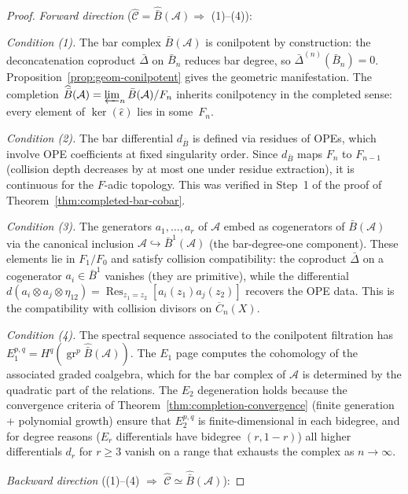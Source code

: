 \begin{proof}
\emph{Forward direction} ($\widehat{\mathcal{C}} = \widehat{\bar{B}}(\mathcal{A}) \Rightarrow$ (1)--(4)):

\emph{Condition (1).} The bar complex $\bar{B}(\mathcal{A})$ is conilpotent by construction: the deconcatenation coproduct $\bar{\Delta}$ on $\bar{B}_n$ reduces bar degree, so $\bar{\Delta}^{(n)}(\bar{B}_n) = 0$.  Proposition~\ref{prop:geom-conilpotent} gives the geometric manifestation.  The completion
$\widehat{\bar{B}}(\mathcal{A}) = \varprojlim_n \bar{B}(\mathcal{A})/F_n$
inherits conilpotency in the completed sense: every element of $\ker(\hat{\epsilon})$ lies in some~$F_n$.

\emph{Condition (2).} The bar differential $d_{\bar{B}}$ is defined via residues of OPEs, which involve OPE coefficients at fixed singularity order.  Since $d_{\bar{B}}$ maps $F_n$ to $F_{n-1}$ (collision depth decreases by at most one under residue extraction), it is continuous for the $F$-adic topology.  This was verified in Step~1 of the proof of Theorem~\ref{thm:completed-bar-cobar}.

\emph{Condition (3).} The generators $a_1, \ldots, a_r$ of $\mathcal{A}$ embed as cogenerators of $\bar{B}(\mathcal{A})$ via the canonical inclusion $\mathcal{A} \hookrightarrow \bar{B}^1(\mathcal{A})$ (the bar-degree-one component).  These elements lie in $F_1/F_0$ and satisfy collision compatibility: the coproduct $\bar{\Delta}$ on a cogenerator $a_i \in \bar{B}^1$ vanishes (they are primitive), while the differential $d(a_i \otimes a_j \otimes \eta_{12}) = \operatorname{Res}_{z_1 = z_2}[a_i(z_1)a_j(z_2)]$ recovers the OPE data.  This is the compatibility with collision divisors on $\overline{C}_n(X)$.

\emph{Condition (4).} The spectral sequence associated
to the conilpotent filtration has
$E_1^{p,q} = H^q(\operatorname{gr}^p
\widehat{\bar{B}}(\mathcal{A}))$.
The $E_1$ page computes the cohomology of the associated graded
coalgebra, which for the bar complex of $\mathcal{A}$ is determined by
the quadratic part of the relations.  The $E_2$ degeneration holds
because the convergence criteria of
Theorem~\ref{thm:completion-convergence} (finite generation +
polynomial growth) ensure that $E_2^{p,q}$ is finite-dimensional in
each bidegree, and for degree reasons ($E_r$ differentials have bidegree
$(r, 1-r)$) all higher differentials $d_r$ for $r \geq 3$ vanish on a
range that exhausts the complex as $n \to \infty$.

\medskip
\emph{Backward direction} ((1)--(4) $\Rightarrow$ $\widehat{\mathcal{C}} \simeq \widehat{\bar{B}}(\mathcal{A})$):


\end{proof}
